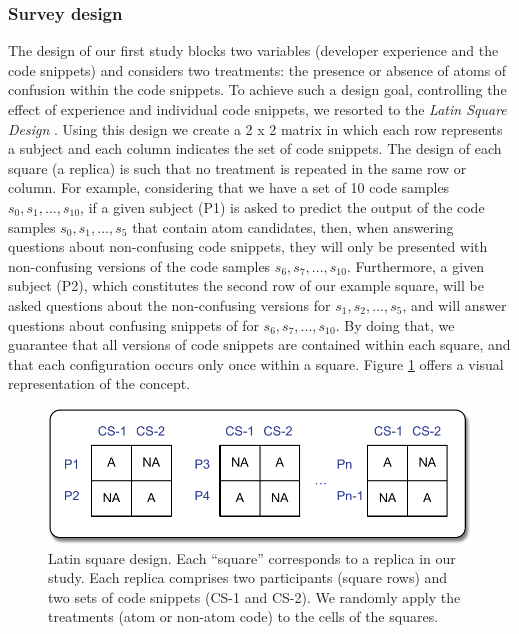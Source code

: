 \subsubsection*{Survey design} 

The design of our first study blocks two variables
(developer experience and the code snippets) and
considers two treatments: the presence or absence of 
atoms of confusion within the code snippets. 
To achieve such a design goal, controlling the effect of experience and individual code snippets, we resorted to the \textit{Latin Square Design} \cite{Hunter-Experimenters}. Using this design we create a 2 x 2 matrix in which each row represents a subject and each column indicates the set of code snippets. The design of each square (a replica) is such that no treatment is repeated in the same row or column. For example, considering that we have a set of 10
code samples $s_0, s_1, ..., s_{10}$, if a given subject (P1) is asked to predict the output of the code samples $s_0, s_1, ..., s_5$ that contain atom candidates, then, when answering questions about non-confusing code snippets, they will only be presented with non-confusing versions of the code samples $s_6, s_7,..., s_{10}$. Furthermore, a given subject (P2), which constitutes the second row of our example square, will be asked questions about the non-confusing versions for $s_1, s_2, ..., s_5$, and will answer questions about confusing snippets of for $s_6, s_7,..., s_{10}$. By doing that, we guarantee that all versions of code snippets are contained within each square, and that each configuration occurs only once within a square. Figure \ref{fig:latinsquare} offers a visual representation of the concept.

  \begin{figure}[htb!]
      \noindent
      \centering
      \includegraphics[scale=.50]{images/latin-square.pdf}
      \caption{Latin square design. Each ``square'' corresponds to 
      a replica in our study. Each replica comprises two participants (square rows) 
      and two sets of code snippets (CS-1 and CS-2). We randomly apply the 
      treatments (atom or non-atom code) to the cells of the squares.} 
      \label{fig:latinsquare}
  \end{figure}


